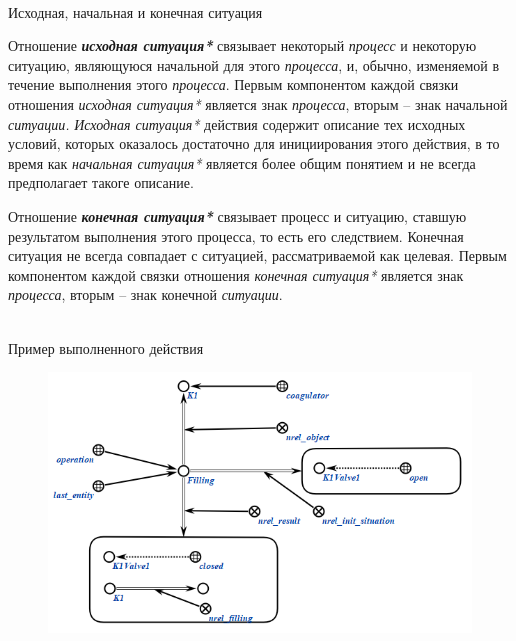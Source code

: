 \begin{frame}{\\Исходная, начальная и конечная ситуация}
\topline
\justifying
\vspace{10mm}

	Отношение \textit{\textbf{исходная ситуация*}} связывает некоторый \textit{процесс} и некоторую ситуацию, являющуюся начальной для этого \textit{процесса}, и, обычно, изменяемой в течение выполнения этого \textit{процесса}.
    Первым компонентом каждой связки отношения \textit{исходная ситуация*} является знак \textit{процесса}, вторым – знак начальной \textit{ситуации.}
    \textit{Исходная ситуация*} действия содержит описание тех исходных условий, которых оказалось достаточно для инициирования этого действия, в то время как \textit{начальная ситуация*} является более общим понятием и не всегда предполагает такоге описание.
    
    \bigskip
    
    Отношение \textit{\textbf{конечная ситуация*}} связывает процесс и ситуацию, ставшую результатом выполнения этого процесса, то есть его следствием. Конечная ситуация не всегда совпадает с ситуацией, рассматриваемой как целевая.
Первым компонентом каждой связки отношения \textit{конечная ситуация*} является знак \textit{процесса}, вторым – знак конечной \textit{ситуации}.
\end{frame}

\begin{frame}{\\Пример выполненного действия}
	\topline
	\justifying
	\vspace{10mm}
	\begin{SCn}
		\begin{figure}[H]
			\includegraphics[scale=0.7]{./figures/sd_temp_entities/process_description.png}
		\end{figure}
	\end{SCn}
\end{frame}